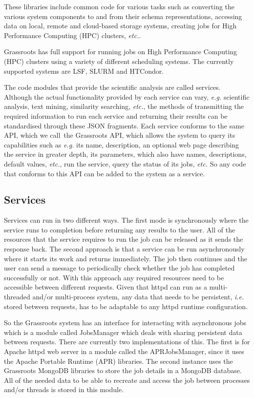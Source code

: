 \documentclass[9pt,a4paper]{extarticle}
\begin{document}
These libraries include common code for various tasks such as converting the various system components to and from their schema representations, accessing data on local, remote and cloud-based storage systems, creating jobs for High Performance Computing (HPC) clusters, \textit{etc.}. 

Grassroots has full support for running jobs on High Performance Computing (HPC) clusters using a variety of different scheduling systems. The currently supported systems are LSF\cite{lsf}, SLURM\cite{yoo2003slurm} and HTCondor\cite{htcondor}.

The code modules that provide the scientific analysis are called services.
Although the actual functionality provided by each service can vary, \textit{e.g.} scientific analysis, text mining, similarity searching, \textit{etc.}, the methods of transmitting the required information to run each service and returning their results can be standardised through these JSON fragments. 
Each service conforms to the same API, which we call\ the Grassroots API, which allows the system to query its capabilities such as \textit{e.g.} its name, description, an optional web page describing the service in greater depth, its parameters, which also have names, descriptions, default values, \textit{etc.}, run the service, query the status of its jobs, \textit{etc.} 
So any code that conforms to this API can be added to the system as a service.


\subsection*{Services}

Services can run in two different ways. 
The first mode is synchronously where the service runs to completion before returning any results to the user. 
All of the resources that the service requires to run the job can be released as it sends the response back.
The second approach is that a service can be run asynchronously where it starts its work and returns immediately. 
The job then continues and the user can send a message to periodically check whether the job has completed successfully or not. 
With this approach any required resources need to be accessible between different requests. 
Given that httpd can run as a multi-threaded and/or multi-process system, any data that needs to be persistent, \textit{i.e.} stored between requests, has to be adaptable to any httpd runtime configuration.

So the Grassroots system has an interface for interacting with asynchronous jobs which is a module called JobsManager which deals with sharing persistent data between requests. 
There are currently two implementations of this. The first is for Apache httpd web server in a module called the APRJobsManager, since it uses the Apache Portable Runtime (APR) libraries. 
The second instance uses the Grassroots MongoDB libraries to store the job details in a MongoDB database.
All of the needed data to be able to recreate and access the job between processes and/or threads is stored in this module.
\end{document}
